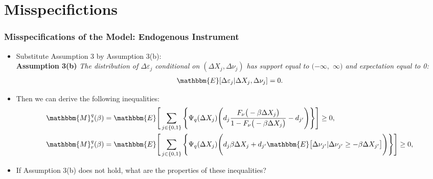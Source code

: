 \section{Misspecifictions}
\begin{frame}
\frametitle{Misspecifications of the Model: Endogenous Instrument}

\begin{itemize}
	\item Substitute Assumption 3 by Assumption 3(b):\\
	\bigskip
	\textbf{Assumption 3(b)} \textit{The distribution of $\Delta\varepsilon_{j}$ conditional on $(\Delta X_{j},\Delta \nu_{j})$ has support equal to $(-\infty,$ $\infty)$ and expectation equal to 0:
	\begin{align*}
	\mathbbm{E}[\Delta\varepsilon_{j}|\Delta X_{j},\Delta \nu_{j}]=0.
	\end{align*}}
	\item Then we can derive the following inequalities:
	\small
	\begin{align*}
	\mathbbm{M}^{q}_{s}(\beta)&=\mathbbm{E}\Bigg[\sum_{j\in\{0,1\}}\Bigg\{\Psi_{q}(\Delta X_{j})\Bigg(d_{j}\frac{F_{\nu}\big(-\beta\Delta X_{j}\big)}{1-F_{\nu}\big(-\beta\Delta X_{j}\big)}-d_{j'}\Bigg)\Bigg\}\Bigg]\geq 0,\\
	\mathbbm{M}^{q}_{r}(\beta)&=\mathbbm{E}\Bigg[\sum_{j\in\{0,1\}}\Bigg\{\Psi_{q}(\Delta X_{j})\Bigg(d_{j}\beta\Delta X_{j}+d_{j'}\mathbbm{E}\big[\Delta\nu_{j'}|\Delta\nu_{j'}\geq-\beta\Delta X_{j'}\big]\Bigg)\Bigg\}\Bigg]\geq 0,
	\end{align*}
	\normalsize
	\item If Assumption 3(b) does not hold, what are the properties of these inequalities?
\end{itemize}
\end{frame}

